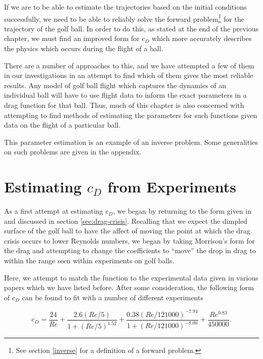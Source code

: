 If we are to be able to estimate the trajectories based on the initial conditions successfully, we
need to be able to reliably solve the forward problem\footnote{See section \ref{inverse} for a definition
of a forward problem.} for the trajectory of the golf ball. In order
to do this, as stated at the end of the previous chapter, we must find an improved form for $c_D$ which
more accurately describes the physics which occurs during the flight of a ball.

There are a number of approaches to this, and we have attempted a few of them in our investigations
in an attempt to find which of them gives the most reliable results. Any model of golf ball flight which
captures the dynamics of an individual ball will have to use flight data to inform the exact parameters
in a drag function for that ball. Thus, much of this chapter is also concerned with attempting to find 
methods of estimating the parameters for such functions given data on the flight of a particular ball.

This parameter estimation is an example of an inverse problem. Some generalities on such problems are
given in the appendix.

\section{Estimating $c_{D}$ from Experiments} \label{morrison}

As a first attempt at estimating $c_D$, we began by returning to the form given in \citet{Morrison2010}
and discussed in section \ref{sec:drag-crisis}. Recalling that we expect the dimpled surface of the
golf ball to have the affect of moving the point at which the drag crisis occurs to lower Reynolds
numbers, we began by taking Morrison's form for the drag and attempting to change the coefficients to
``move'' the drop in drag to within the range seen within experiments on golf balls.

Here, we attempt to match the function to the experimental data given in various papers which we
have listed before. After some consideration, the following form of $c_D$ can be found to fit
with a number of different experiments

\begin{equation} \label{drag-m-mod}
c_D = \frac{24}{Re} + \frac{2.6(Re/5)}{1 + (Re/5)^{1.52}} + \frac{0.38(Re/121000)^{-7.94}}{1+(Re/121000)^{-8.00}}
+ \frac{Re^{0.83}}{450000} .
\end{equation}


